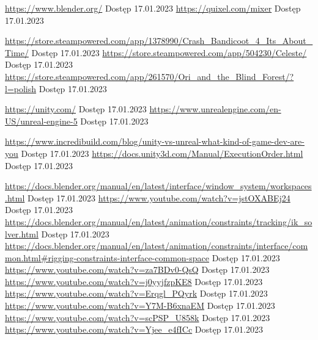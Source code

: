 \documentclass[12pt,twoside]{article}
\begin{document}
\begin{thebibliography}{4}
 \url{https://www.blender.org/} Dostęp 17.01.2023
 \url{https://quixel.com/mixer} Dostęp 17.01.2023

 \url{https://store.steampowered.com/app/1378990/Crash_Bandicoot_4_Its_About_Time/} Dostęp 17.01.2023
 \url{https://store.steampowered.com/app/504230/Celeste/} Dostęp 17.01.2023
 \url{https://store.steampowered.com/app/261570/Ori_and_the_Blind_Forest/?l=polish} Dostęp 17.01.2023

 \url{https://unity.com/} Dostęp 17.01.2023
 \url{https://www.unrealengine.com/en-US/unreal-engine-5} Dostęp 17.01.2023



 \url{https://www.incredibuild.com/blog/unity-vs-unreal-what-kind-of-game-dev-are-you} Dostęp 17.01.2023
 \url{https://docs.unity3d.com/Manual/ExecutionOrder.html} Dostęp 17.01.2023

 \url{https://docs.blender.org/manual/en/latest/interface/window_system/workspaces.html} Dostęp 17.01.2023
 \url{https://www.youtube.com/watch?v=jstOXABEj24} Dostęp 17.01.2023
 \url{https://docs.blender.org/manual/en/latest/animation/constraints/tracking/ik_solver.html} Dostęp 17.01.2023
 \url{https://docs.blender.org/manual/en/latest/animation/constraints/interface/common.html#rigging-constraints-interface-common-space} Dostęp 17.01.2023
 \url{https://www.youtube.com/watch?v=za7BDv0-QsQ} Dostęp 17.01.2023
 \url{https://www.youtube.com/watch?v=j0yyjfzpKE8} Dostęp 17.01.2023
 \url{https://www.youtube.com/watch?v=Erqgl_PQyrk} Dostęp 17.01.2023
 \url{https://www.youtube.com/watch?v=Y7M-B6xnaEM} Dostęp 17.01.2023
 \url{https://www.youtube.com/watch?v=scPSP_U858k} Dostęp 17.01.2023
 \url{https://www.youtube.com/watch?v=Yjee_e4fICc} Dostęp 17.01.2023

\end{thebibliography}

\clearpage

\makesummary
\end{document}
